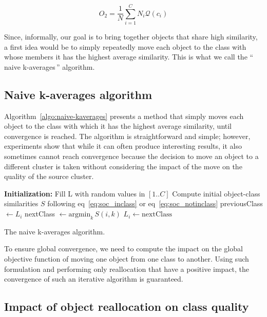 \documentclass[twoside,11pt]{article}
\newcommand{\gl}[1]{``\,#1\,''} %
\begin{document}
\[
O_2 = \frac{1}{N} \sum_{i=1}^{C} N_i \mathcal{Q}(c_i)
\]

Since, informally, our goal is to bring together objects that share high similarity, a first idea would be to simply repeatedly move each object to the class with whose members it has the highest average similarity. This is what we call the \gl{naive k-averages} algorithm.

\subsection{Naive k-averages algorithm}

Algorithm~\ref{algo:naive-kaverages} presents a method that simply moves each object to the class with which it has the highest average similarity, until convergence is reached. The algorithm is straightforward and simple; however, experiments show that while it can often produce interesting results, it also sometimes cannot reach convergence because the decision to move an object to a different cluster is taken without considering the impact of the move on the quality of the source cluster.

\begin{algorithm}
	\label{algo:naive-kaverages}
	\SetAlgoLined
	\BlankLine	
	\textbf{Initialization:} 
		Fill L with random values in $[1..C]$\;
		Compute initial object-class similarities $S$ following eq~\ref{eq:soc_inclass} or eq~\ref{eq:soc_notinclass}\;
	\BlankLine	
	 {
		 {
			previousClass $\leftarrow L_i$\;
			nextClass $\leftarrow \mathrm{argmin}_k\, S(i, k)$
			 {
				$L_i \leftarrow \mathrm{nextClass}$\;
			}
		}
	}
	\BlankLine
	\caption{The naive k-averages algorithm.}
\end{algorithm}

To ensure global convergence, we need to compute the impact on the global objective function of moving one object from one class to another. Using such formulation and performing only reallocation that have a positive impact, the convergence of such an iterative algorithm is guaranteed. 

\subsection{Impact of object reallocation on class quality}
\end{document}
